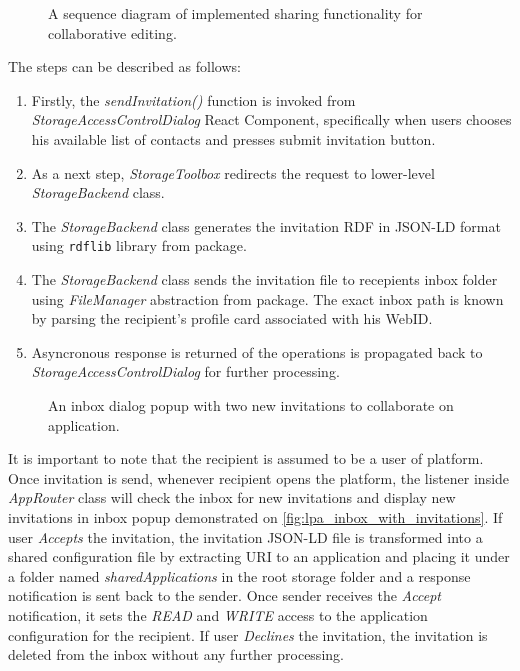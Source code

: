 \begin{figure}[h]
\centering
{}
\caption{A sequence diagram of implemented sharing functionality for collaborative editing.}
\label{fig:lpas_sharing_application}
\end{figure}
  
The steps can be described as follows:
\begin{enumerate}
    \item Firstly, the \textit{sendInvitation()} function is invoked from \textit{StorageAccessControlDialog} React Component, specifically when users chooses his available list of contacts and presses submit invitation button.
    \item As a next step, \textit{StorageToolbox} redirects the request to lower-level \textit{StorageBackend} class.
    \item The \textit{StorageBackend} class generates the invitation RDF in JSON-LD format using \texttt{rdflib} library from \lpas{} package.
    \item The \textit{StorageBackend} class sends the invitation file to recepients inbox folder using \textit{FileManager} abstraction from \lpas{} package. The exact inbox path is known by parsing the recipient's profile card associated with his WebID.
    \item Asyncronous response is returned of the operations is propagated back to \textit{StorageAccessControlDialog} for further processing. 
\end{enumerate}
 
\begin{figure}[h]
\centering
{}
\caption{An inbox dialog popup with two new invitations to collaborate on application.}
\label{fig:lpa_inbox_with_invitations}
\end{figure}
  
 
It is important to note that the recipient is assumed to be a user of \lpa{} platform. Once invitation is send, whenever recipient opens the platform, the listener inside \textit{AppRouter} class will check the inbox for new invitations and display new invitations in inbox popup demonstrated on \autoref{fig:lpa_inbox_with_invitations}. If user \textit{Accepts} the invitation, the invitation JSON-LD file is transformed into a shared configuration file by extracting URI to an application and placing it under a folder named \textit{sharedApplications} in the root storage folder and a response notification is sent back to the sender. Once sender receives the \textit{Accept} notification, it sets the \textit{READ} and \textit{WRITE} access to the application configuration for the recipient. If user \textit{Declines} the invitation, the invitation is deleted from the inbox without any further processing.


